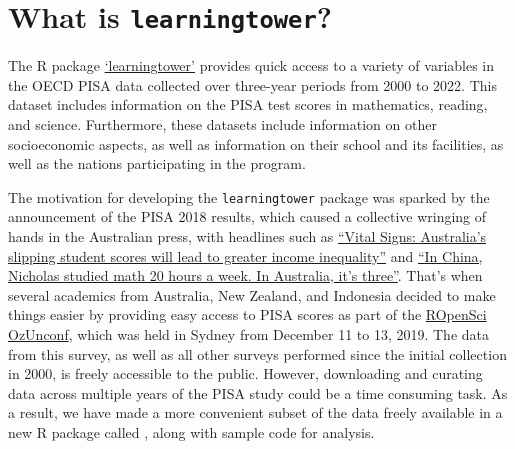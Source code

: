 \section{\texorpdfstring{What is \texttt{learningtower}?}{What is learningtower?}}\label{what-is-learningtower}

The R package \href{https://cran.r-project.org/web/packages/learningtower/index.html}{`learningtower'} \citep{learningtower} provides quick access to a variety of variables in the OECD PISA data collected over three-year periods from 2000 to 2022. This dataset includes information on the PISA test scores in mathematics, reading, and science. Furthermore, these datasets include information on other socioeconomic aspects, as well as information on their school and its facilities, as well as the nations participating in the program.

The motivation for developing the \texttt{learningtower} package was sparked by the announcement of the PISA 2018 results, which caused a collective wringing of hands in the Australian press, with headlines such as \href{https://theconversation.com/vital-signs-australias-slipping-student-scores-will-lead-to-greater-income-inequality-128301}{``Vital Signs: Australia's slipping student scores will lead to greater income inequality''} and \href{https://www.smh.com.au/education/in-china-nicholas-studied-maths-20-hours-a-week-in-australia-it-s-three-20191203-p53ggv.html}{``In China, Nicholas studied math 20 hours a week. In Australia, it's three''}. That's when several academics from Australia, New Zealand, and Indonesia decided to make things easier by providing easy access to PISA scores as part of the \href{https://ozunconf19.ropensci.org/}{ROpenSci OzUnconf}, which was held in Sydney from December 11 to 13, 2019. The data from this survey, as well as all other surveys performed since the initial collection in 2000, is freely accessible to the public. However, downloading and curating data across multiple years of the PISA study could be a time consuming task. As a result, we have made a more convenient subset of the data freely available in a new R package called , along with sample code for analysis.

